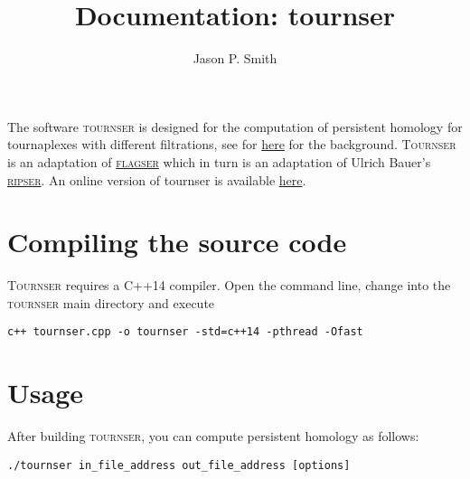 \documentclass{amsart}
\theoremstyle{definition}
\begin{document}
\title{Documentation: tournser}

\author{Jason P. Smith}
\address{University of Aberdeen, Aberdeen, United Kingdom}

\maketitle

\noindent
The software \textsc{tournser} is designed for the computation of persistent
homology for tournaplexes with different filtrations, see for \href{https://arxiv.org/abs/2003.00324}{here} for the background.
\textsc{Tournser} is an adaptation of \href{https://github.com/luetge/flagser}{\textsc{flagser}}
 which in turn is an adaptation of Ulrich Bauer's
\href{https://github.com/Ripser/ripser}{\textsc{ripser}}.
An online version of tournser is available \href{https://homepages.abdn.ac.uk/neurotopology/tournser.html}{here}.


\section{Compiling the source code}
\noindent
\textsc{Tournser} requires a C++14 compiler.
Open the command line, change into the \textsc{tournser} main directory and execute

\vspace{1em}

\begin{verbatim}c++ tournser.cpp -o tournser -std=c++14 -pthread -Ofast\end{verbatim}

\vspace{1em}


\section{Usage}
\noindent
After building \textsc{tournser}, you can compute persistent homology as follows:

\vspace{1em}

\begin{verbatim}./tournser in_file_address out_file_address [options]\end{verbatim}
\end{document}

